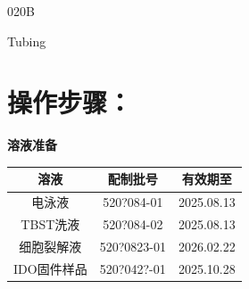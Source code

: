 \documentclass[UTF8,10pt,a4paper,fontset=fandol]{ctexart}
\newcommand{\fieldvalue}[1]{#1}
\newcommand{\handwritten}[1]{#1}
\begin{document}
\fieldvalue{\handwritten{020B}}

\fieldvalue{\handwritten{Tubing}}

\section{操作步骤：}


\newpage

\begin{center}
\textbf{溶液准备}
\end{center}

\small
\begin{tabular}{|c|c|c|}
\hline
溶液 & 配制批号 & 有效期至 \\
\hline
电泳液 &
\fieldvalue{\handwritten{520?084-01}} &
\fieldvalue{\handwritten{2025.08.13}} \\
\hline
TBST洗液 &
\fieldvalue{\handwritten{520?084-02}} &
\fieldvalue{\handwritten{2025.08.13}} \\
\hline
细胞裂解液 &
\fieldvalue{\handwritten{520?0823-01}} &
\fieldvalue{\handwritten{2026.02.22}} \\
\hline
IDO固件样品 &
\fieldvalue{\handwritten{520?042?-01}} &
\fieldvalue{\handwritten{2025.10.28}} \\
\hline
\end{tabular}
\end{document}
